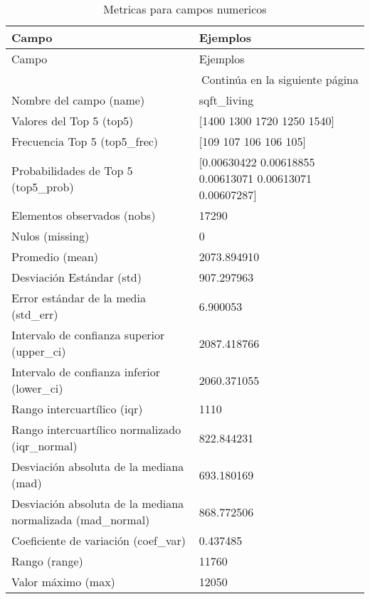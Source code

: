 \begin{longtable}{|m{10em}|m{25em}|}
    \caption{Metricas para campos numericos} 
    \label{metricas-numericas} \\
    \hline
    \rowcolor[gray]{0.8}
    Campo & Ejemplos \\
    \hline
    \endfirsthead
    
    \hline
    \rowcolor[gray]{0.8}
    Campo & Ejemplos \\
    \hline
    \endhead
    
    \hline \multicolumn{2}{|r|}{{Continúa en la siguiente página}} \\ \hline
    \endfoot
    
    \hline \hline
    \endlastfoot
    
    \hline
    Nombre del campo (name) & sqft\_living \\ \hline
    Valores del Top 5 (top5) & [1400 1300 1720 1250 1540] \\ \hline
    Frecuencia Top 5 (top5\_frec) & [109 107 106 106 105] \\ \hline
    Probabilidades de Top 5 (top5\_prob) & [0.00630422 0.00618855 0.00613071 0.00613071 0.00607287] \\ \hline
    Elementos observados (nobs) & 17290 \\ \hline
    Nulos (missing) & 0 \\ \hline
    Promedio (mean) & 2073.894910 \\ \hline
    Desviación Estándar (std) & 907.297963 \\ \hline
    Error estándar de la media (std\_err) & 6.900053 \\ \hline
    Intervalo de confianza superior (upper\_ci) & 2087.418766 \\ \hline
    Intervalo de confianza inferior (lower\_ci) & 2060.371055 \\ \hline
    Rango intercuartílico (iqr) & 1110 \\ \hline
    Rango intercuartílico normalizado (iqr\_normal) & 822.844231 \\ \hline
    Desviación absoluta de la mediana (mad) & 693.180169 \\ \hline
    Desviación absoluta de la mediana normalizada (mad\_normal) & 868.772506 \\ \hline
    Coeficiente de variación (coef\_var) & 0.437485 \\ \hline
    Rango (range) & 11760 \\ \hline
    Valor máximo (max) & 12050 \\ \hline

\end{longtable}
